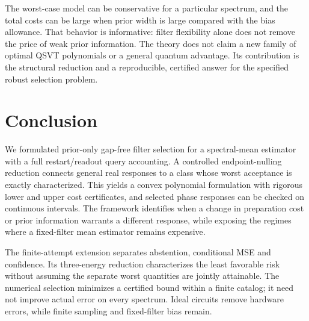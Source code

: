 \documentclass[11pt]{article}
\begin{document}
The worst-case model can be conservative for a particular spectrum, and
the total costs can be large when prior width is large compared with the
bias allowance. That behavior is informative: filter flexibility alone
does not remove the price of weak prior information. The theory does not
claim a new family of optimal QSVT polynomials or a general quantum
advantage. Its contribution is the structural reduction and a
reproducible, certified answer for the specified robust selection problem.

\section{Conclusion}
We formulated prior-only gap-free filter selection for a spectral-mean
estimator with a full restart/readout query accounting. A controlled
endpoint-nulling reduction connects general real responses to a class
whose worst acceptance is exactly characterized. This yields a convex
polynomial formulation with rigorous lower and upper cost certificates,
and selected phase responses can be checked on continuous intervals.
The framework identifies when a change in preparation cost or prior
information warrants a different response, while exposing the regimes
where a fixed-filter mean estimator remains expensive.

The finite-attempt extension separates abstention, conditional MSE and
confidence. Its three-energy reduction characterizes the least favorable
risk without assuming the separate worst quantities are jointly attainable.
The numerical selection minimizes a certified bound within a finite catalog;
it need not improve actual error on every spectrum. Ideal circuits remove
hardware errors, while finite sampling and fixed-filter bias remain.

\appendix


\end{document}
